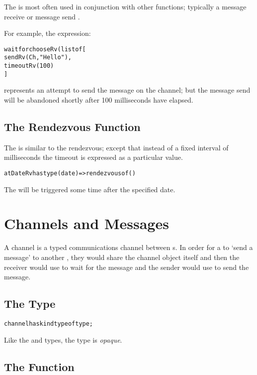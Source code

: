 \noindent
The  is most often used in conjunction with other  functions;  typically a message receive or message send .

For example, the expression:
\begin{alltt}
wait for chooseRv(list of [
  sendRv(Ch,"Hello"),
  timeoutRv(100)
]
\end{alltt}
represents an attempt to send the  message on the  channel; but the message send will be abandoned shortly after 100 milliseconds have elapsed.

\subsection{The  Rendezvous Function}
\label{atDateRvFun}
The  is similar to the  rendezvous; except that instead of a fixed interval of milliseconds the timeout is expressed as a particular  value.
\begin{alltt}
atDateRv has type (date)=>rendezvous of ()
\end{alltt}
The  will be triggered some time after the specified date.

\section{Channels and Messages}
\label{channels}

A channel is a typed communications channel between s. In order for a  to `send a message' to another , they would share the channel object itself and then the receiver would use  to wait for the message and the sender would use  to send the message.

\subsection{The  Type}
\label{channelType}

\begin{alltt}
channel has kind type of type;
\end{alltt}

Like the  and  types, the  type is \emph{opaque}.

\subsection{The  Function}
\label{channelFun}

